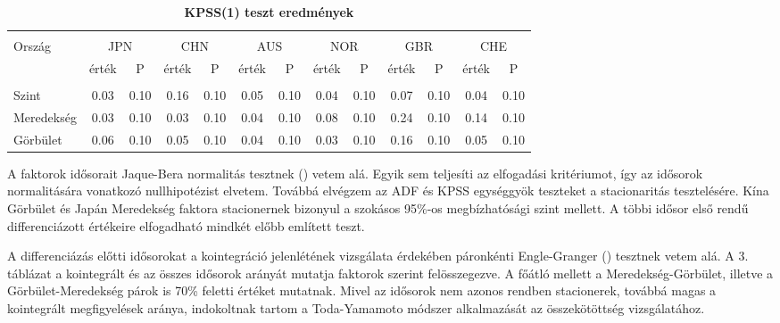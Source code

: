 \documentclass[12pt,bibliography=totoc]{article}
\begin{document}
\begin{table}
\begin{subtable}[t]{1\textwidth}
\begin{tabular}{l cc cc cc cc cc cc}
\hline   \\ [-1.5ex]    

Ország	&	\multicolumn{2}{c}{JPN}			&	\multicolumn{2}{c}{CHN}			&	\multicolumn{2}{c}{AUS}			&	\multicolumn{2}{c}{NOR}			&	\multicolumn{2}{c}{GBR}			&	\multicolumn{2}{c}{CHE}			\\

 & érték &P & érték &P& érték &P & érték &P& érték &P & érték &P\\

\hline       \\ [-1.5ex] 

Szint	&	0.03	&	0.10	&	0.16	&	0.10	&	0.05	&	0.10	&	0.04	&	0.10	&	0.07	&	0.10	&	0.04	&	0.10	\\
Meredekség	&	0.03	&	0.10	&	0.03	&	0.10	&	0.04	&	0.10	&	0.08	&	0.10	&	0.24	&	0.10	&	0.14	&	0.10	\\
Görbület	&	0.06	&	0.10	&	0.05	&	0.10	&	0.04	&	0.10	&	0.03	&	0.10	&	0.16	&	0.10	&	0.05	&	0.10	\\


\hline
\end{tabular}
\caption{\textbf{KPSS(1) teszt eredmények}}
\end{subtable}
\hspace{\fill}
\end{table}




A faktorok idősorait Jaque-Bera normalitás tesztnek (\cite{bera1981efficient}) vetem alá. Egyik sem teljesíti az elfogadási kritériumot, így az idősorok normalitására vonatkozó nullhipotézist elvetem. Továbbá elvégzem az ADF és KPSS egységgyök teszteket a stacionaritás tesztelésére. Kína Görbület és Japán Meredekség faktora stacionernek bizonyul a szokásos 95\%-os megbízhatósági szint mellett. A többi idősor első rendű differenciázott értékeire elfogadható mindkét előbb említett teszt. 

A differenciázás előtti idősorokat a kointegráció jelenlétének vizsgálata érdekében páronkénti Engle-Granger (\cite{engle1987co}) tesztnek vetem alá. A 3. táblázat a kointegrált és az összes idősorok arányát mutatja faktorok szerint felösszegezve. A főátló mellett a Meredekség-Görbület, illetve a Görbület-Meredekség párok is 70\% feletti értéket mutatnak. Mivel az idősorok nem azonos rendben stacionerek, továbbá magas a kointegrált megfigyelések aránya, indokoltnak tartom a Toda-Yamamoto módszer alkalmazását az összekötöttség vizsgálatához.
\end{document}

